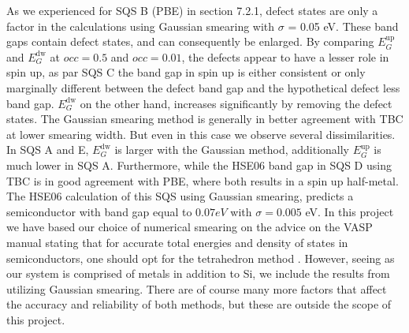 As we experienced for SQS B (PBE) in section 7.2.1, defect states are only a factor in the calculations using Gaussian smearing with $\sigma$ = 0.05 eV. These band gaps contain defect states, and can consequently be enlarged. By comparing $E_G ^\text{up}$ and $E_G ^\text{dw}$ at $occ = 0.5$ and $occ = 0.01$, the defects appear to have a lesser role in spin up, as par SQS C the band gap in spin up is either consistent or only marginally different between the defect band gap and the hypothetical defect less band gap. $E_G ^\text{dw}$ on the other hand, increases significantly by removing the defect states. The Gaussian smearing method is generally in better agreement with TBC at lower smearing width. But even in this case we observe several dissimilarities. In SQS A and E, $E_G ^\text{dw}$ is larger with the Gaussian method, additionally $E_G ^\text{up}$ is much lower in SQS A. Furthermore, while the HSE06 band gap in SQS D using TBC is in good agreement with PBE, where both results in a spin up half-metal. The HSE06 calculation of this SQS using Gaussian smearing, predicts a semiconductor with band gap equal to $0.07 eV$ with $\sigma = 0.005$ eV. In this project we have based our choice of numerical smearing on the advice on the VASP manual stating that for accurate total energies and density of states in semiconductors, one should opt for the tetrahedron method \cite{ismear}.  However, seeing as our system is comprised of metals in addition to Si, we include the results from utilizing Gaussian smearing. There are of course many more factors that affect the accuracy and reliability of both methods, but these are outside the scope of this project.

